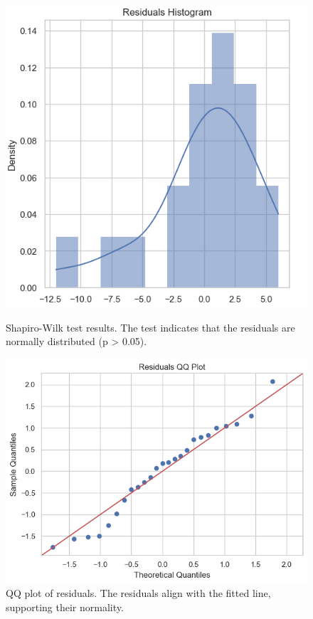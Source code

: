 \documentclass{mcmthesis}  %
\begin{document}
\begin{figure}[H]
\begin{minipage}[b]{0.21\textwidth}
    \includegraphics[width=\textwidth]{first_medal/6}
    \caption{Shapiro-Wilk test results. The test indicates that the residuals are normally distributed (p > 0.05).}
    \label{fig:image-b}
  \end{minipage}
  \hfill
  \begin{minipage}[b]{0.21\textwidth}
    \includegraphics[width=\textwidth]{first_medal/7}
    \caption{QQ plot of residuals. The residuals align with the fitted line, supporting their normality.}
    \label{fig:image-b}
  \end{minipage}
  \label{fig:images}
\end{figure}
\end{document}

